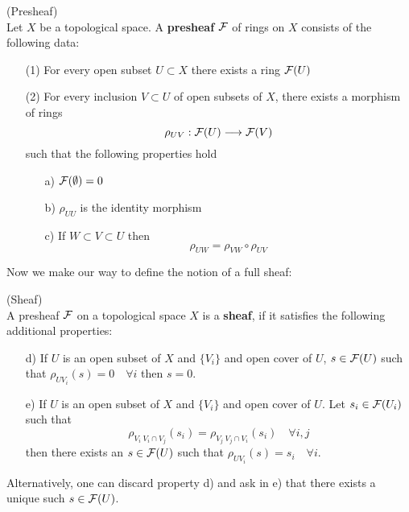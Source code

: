 \begin{definition} (Presheaf)\\
  Let $X$ be a topological space. A \textbf{presheaf} ${\mathcal{F}}$ of rings on $X$ consists of the following data:
  \begin{itemize}
    \item[(1)] For every open subset $U\subset X$ there exists a ring ${\mathcal{F}}(U)$

    \item[(2)] For every inclusion $V \subset U$ of open subsets of $X$, there exists a morphism of rings
    $$ \rho_{UV} : {\mathcal{F}}(U) \longrightarrow {\mathcal{F}}(V) $$
    such that the following properties hold
    \begin{itemize}
      \item[a)] ${\mathcal{F}}(\emptyset) = 0$

      \item[b)] $\rho_{UU}$ is the identity morphism

      \item[c)] If $W\subset V \subset U$ then
      $$ \rho_{UW} = \rho_{VW} \circ \rho_{UV} $$

    \end{itemize}
  \end{itemize}
\end{definition}

Now we make our way to define the notion of a full sheaf:

\begin{definition} (Sheaf)\\
  A presheaf ${\mathcal{F}}$ on a topological space $X$ is a \textbf{sheaf}, if it satisfies the following additional properties:
  \begin{itemize}
    \item[d)] If $U$ is an open subset of $X$ and $\{V_i\}$ and open cover of $U$, $s\in{\mathcal{F}}(U)$ such that $\rho_{UV_i}(s) = 0 \quad \forall i$ then $s=0$.

    \item[e)] If $U$ is an open subset of $X$ and $\{V_i\}$ and open cover of $U$. Let $s_i \in {\mathcal{F}}(U_i)$ such that
    $$ \rho_{V_i \ V_i \cap V_j} (s_i) = \rho_{V_j \ V_j \cap V_i} (s_i) \quad \forall i,j$$
    then there exists an $s\in{\mathcal{F}}(U)$ such that $\rho_{U V_i} (s) = s_i \quad \forall i$.
  \end{itemize}
  Alternatively, one can discard property d) and ask in e) that there exists a unique such $s\in{\mathcal{F}}(U)$.
\end{definition}

